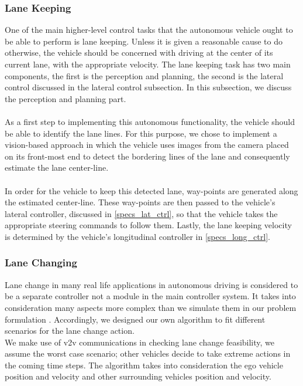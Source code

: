 \subsubsection{Lane Keeping}
\label{specs_lane_keep}
One of the main higher-level control tasks that the autonomous vehicle ought to be able to perform is lane keeping. Unless it is given a reasonable cause to do otherwise, the vehicle should be concerned with driving at the center of its current lane, with the appropriate velocity. The lane keeping task has two main components, the first is the perception and planning, the second is the lateral control discussed in the lateral control subsection. In this subsection, we discuss the perception  and planning part.
\\ \\
As a first step to implementing this autonomous functionality, the vehicle should be able to identify the lane lines. For this purpose, we chose to implement a vision-based approach in which the vehicle uses images from the camera placed on its front-most end to detect the bordering lines of the lane and consequently estimate the lane center-line.
\\ \\
In order for the vehicle to keep this detected lane, way-points are generated along the estimated center-line. These way-points are then passed to the vehicle’s lateral controller, discussed in \ref{specs_lat_ctrl}, so that the vehicle takes the appropriate steering commands to follow them. Lastly, the lane keeping velocity is determined by the vehicle’s longitudinal controller in \ref{specs_long_ctrl}.

\subsubsection{Lane Changing}
\label{specs_lane_change}
Lane change in many real life applications in autonomous driving is considered to be a separate controller not a module in the main controller system. It takes into consideration many aspects more complex than we simulate them in our problem formulation \cite{doi:10.1002/atr.5670430104}. Accordingly, we designed our own algorithm to fit different scenarios for the lane change action.  \\
We make use of v2v communications in checking lane change feasibility, we assume the worst case scenario; other vehicles decide to take extreme actions in the coming time steps.
The algorithm takes into consideration the ego vehicle position and velocity and other surrounding vehicles position and velocity.


